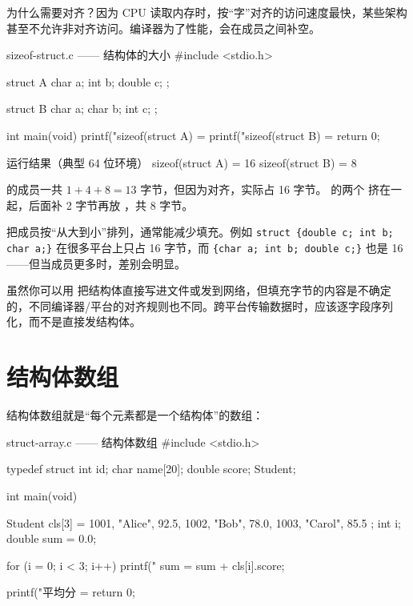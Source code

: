 为什么需要对齐？因为 CPU 读取内存时，按“字”对齐的访问速度最快，某些架构甚至不允许非对齐访问。编译器为了性能，会在成员之间补空。

\begin{codebox}{sizeof-struct.c —— 结构体的大小}
#include <stdio.h>

struct A {
    char a;
    int b;
    double c;
};

struct B {
    char a;
    char b;
    int c;
};

int main(void)
{
    printf("sizeof(struct A) = %
    printf("sizeof(struct B) = %
    return 0;
}
\end{codebox}

\begin{outbox}{运行结果（典型 64 位环境）}
sizeof(struct A) = 16
sizeof(struct B) = 8
\end{outbox}

 的成员一共 $1 + 4 + 8 = 13$ 字节，但因为对齐，实际占 16 字节。 的两个  挤在一起，后面补 2 字节再放 ，共 8 字节。

\begin{tipbox}[省内存的小技巧]
把成员按“从大到小”排列，通常能减少填充。例如 \texttt{struct \{double c; int b; char a;\}} 在很多平台上只占 16 字节，而 \texttt{\{char a; int b; double c;\}} 也是 16——但当成员更多时，差别会明显。
\end{tipbox}

\begin{pitfall}[不要把结构体的内存布局当成协议]
虽然你可以用  把结构体直接写进文件或发到网络，但填充字节的内容是不确定的，不同编译器/平台的对齐规则也不同。跨平台传输数据时，应该逐字段序列化，而不是直接发结构体。
\end{pitfall}

\section{结构体数组}

结构体数组就是“每个元素都是一个结构体”的数组：

\begin{codebox}{struct-array.c —— 结构体数组}
#include <stdio.h>

typedef struct {
    int id;
    char name[20];
    double score;
} Student;

int main(void)
{
    Student cls[3] = {
        {1001, "Alice", 92.5},
        {1002, "Bob",   78.0},
        {1003, "Carol", 85.5}
    };
    int i;
    double sum = 0.0;

    for (i = 0; i < 3; i++) {
        printf("%
        sum = sum + cls[i].score;
    }

    printf("平均分 = %
    return 0;
}
\end{codebox}

